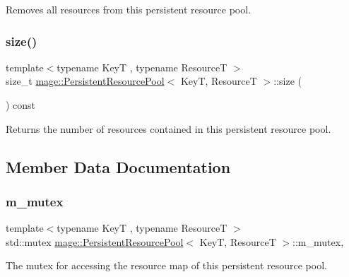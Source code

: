 Removes all resources from this persistent resource pool. \hypertarget{classmage_1_1_persistent_resource_pool_a97dee6f5087b59f3e5b4fe14dca74b40}{}\label{classmage_1_1_persistent_resource_pool_a97dee6f5087b59f3e5b4fe14dca74b40} 
\subsubsection{\texorpdfstring{size()}{size()}}
{\footnotesize\ttfamily template$<$typename KeyT , typename ResourceT $>$ \\
size\+\_\+t \hyperlink{classmage_1_1_persistent_resource_pool}{mage\+::\+Persistent\+Resource\+Pool}$<$ KeyT, ResourceT $>$\+::size (\begin{DoxyParamCaption}{ }\end{DoxyParamCaption}) const\hspace{0.3cm}{\ttfamily [noexcept]}}

Returns the number of resources contained in this persistent resource pool. 

\subsection{Member Data Documentation}
\hypertarget{classmage_1_1_persistent_resource_pool_ac62c20842345306be0cddda2cb0d0524}{}\label{classmage_1_1_persistent_resource_pool_ac62c20842345306be0cddda2cb0d0524} 
\subsubsection{\texorpdfstring{m\+\_\+mutex}{m\_mutex}}
{\footnotesize\ttfamily template$<$typename KeyT , typename ResourceT $>$ \\
std\+::mutex \hyperlink{classmage_1_1_persistent_resource_pool}{mage\+::\+Persistent\+Resource\+Pool}$<$ KeyT, ResourceT $>$\+::m\+\_\+mutex\hspace{0.3cm}{\ttfamily [mutable]}, {\ttfamily [private]}}

The mutex for accessing the resource map of this persistent resource pool. \hypertarget{classmage_1_1_persistent_resource_pool_a9fec1e7492b5aea2a006b4e150289795}{}\label{classmage_1_1_persistent_resource_pool_a9fec1e7492b5aea2a006b4e150289795} 
